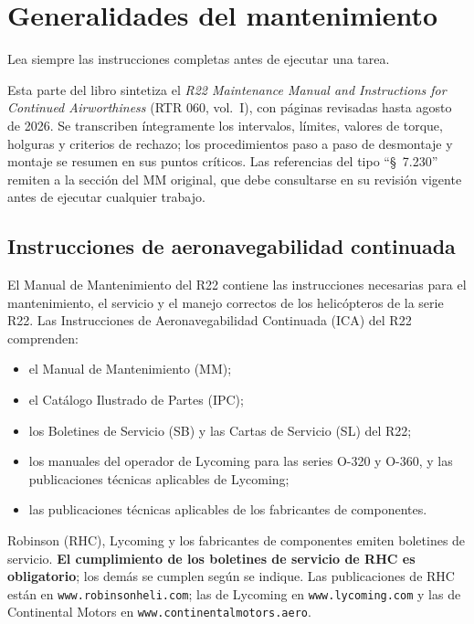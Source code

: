\chapter{Generalidades del mantenimiento}
\label{cap:mm-general}

\opening{Lea siempre las instrucciones completas antes de ejecutar una tarea.}

\begin{nota}
Esta parte del libro sintetiza el \emph{R22 Maintenance Manual and Instructions for Continued Airworthiness} (RTR 060, vol.~I), con páginas revisadas hasta agosto de 2026. Se transcriben íntegramente los intervalos, límites, valores de torque, holguras y criterios de rechazo; los procedimientos paso a paso de desmontaje y montaje se resumen en sus puntos críticos. Las referencias del tipo ``§~7.230'' remiten a la sección del MM original, que debe consultarse en su revisión vigente antes de ejecutar cualquier trabajo.
\end{nota}

\section{Instrucciones de aeronavegabilidad continuada}

El Manual de Mantenimiento del R22 contiene las instrucciones necesarias para el mantenimiento, el servicio y el manejo correctos de los helicópteros de la serie R22. Las Instrucciones de Aeronavegabilidad Continuada (ICA) del R22 comprenden:

\begin{itemize}
\item el Manual de Mantenimiento (MM);
\item el Catálogo Ilustrado de Partes (IPC);
\item los Boletines de Servicio (SB) y las Cartas de Servicio (SL) del R22;
\item los manuales del operador de Lycoming para las series O-320 y O-360, y las publicaciones técnicas aplicables de Lycoming;
\item las publicaciones técnicas aplicables de los fabricantes de componentes.
\end{itemize}

Robinson (RHC), Lycoming y los fabricantes de componentes emiten boletines de servicio. \textbf{El cumplimiento de los boletines de servicio de RHC es obligatorio}; los demás se cumplen según se indique. Las publicaciones de RHC están en \texttt{www.robinsonheli.com}; las de Lycoming en \texttt{www.lycoming.com} y las de Continental Motors en \texttt{www.continentalmotors.aero}.

